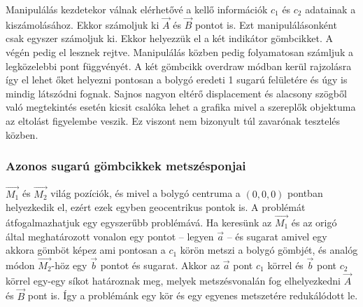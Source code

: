 Manipulálás kezdetekor válnak elérhetővé a kellő információk $c_1$ és $c_2$ adatainak a kiszámolásához. Ekkor számoljuk ki $\overrightarrow{A}$ és $\overrightarrow{B}$ pontot is. Ezt manipulálásonként csak egyszer számoljuk ki. Ekkor helyezzük el a két indikátor gömbcikket. A végén pedig el lesznek rejtve. Manipulálás közben pedig folyamatosan számljuk a legközelebbi pont függvényét. A két gömbcikk overdraw módban kerül rajzolásra így el lehet őket helyezni pontosan a bolygó eredeti 1 sugarú felületére és úgy is mindig látszódni fognak. Sajnos nagyon eltérő displacement és alacsony szögből való megtekintés esetén kicsit csalóka lehet a grafika mivel a szereplők objektuma az eltolást figyelembe veszik. Ez viszont nem bizonyult túl zavarónak tesztelés közben.

\subsubsection{Azonos sugarú gömbcikkek metszésponjai}

$\overrightarrow{M_1}$ és $\overrightarrow{M_2}$ világ pozíciók, és mivel a bolygó centruma a $(0, 0, 0)$ pontban helyezkedik el, ezért ezek egyben geocentrikus pontok is. A problémát átfogalmazhatjuk egy egyszerűbb problémává. Ha keresünk az $\overrightarrow{M_1}$ és az origó által meghatározott vonalon egy pontot -- legyen $\overrightarrow{a}$ -- és sugarat amivel egy akkora gömböt képez ami pontosan a $c_1$ körön metszi a bolygó gömbjét, és analóg módon $\overrightarrow{M_2}$-höz egy $\overrightarrow{b}$ pontot és sugarat. Akkor az $\overrightarrow{a}$ pont $c_1$ körrel és $\overrightarrow{b}$ pont $c_2$ körrel egy-egy síkot határoznak meg, melyek metszésvonalán fog elhelyezkedni $\overrightarrow{A}$ és $\overrightarrow{B}$ pont is. Így a problémánk egy kör és egy egyenes metszetére redukálódott le.

